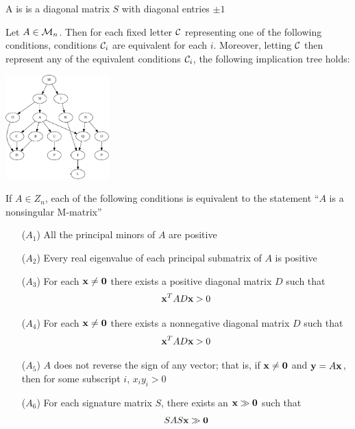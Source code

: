 \documentclass[aspectratio=169]{beamer}
\begin{document}
\begin{frame}
\begin{definition}
 A  is is a diagonal matrix $S$ with diagonal entries $\pm 1$
\end{definition}   
\end{frame}



\begin{frame}
\begin{theorem}
Let $A\in\mathcal{M}_n$. Then for each fixed letter $\mathcal{C}$ representing one of the following conditions, conditions $\mathcal{C}_i$ are equivalent for each $i$. Moreover, letting $\mathcal{C}$ then represent any of the equivalent conditions $\mathcal{C}_i$, the following implication tree holds:
\begin{center}
	\includegraphics[width=0.3\textwidth]{BermanPlemmons_fig}
\end{center}
If $A\in Z_n$, each of the following conditions is equivalent to the statement ``$A$ is a nonsingular M-matrix''
\end{theorem}
\end{frame}

\begin{frame}
\addtocounter{theorem}{-1}
\begin{theorem}[Continued]
\begin{enumerate}
\item[($A_1$)] All the principal minors of $A$ are positive
\item[($A_2$)] Every real eigenvalue of each principal submatrix of $A$ is positive
\item[($A_3$)] For each $\bx\neq\b0$ there exists a positive diagonal matrix $D$ such that
\[
\mathbf{x}^TAD\mathbf{x}>0
\]
\item[($A_4$)] For each $\bx\neq\b0$ there exists a nonnegative diagonal matrix $D$ such that
\[
\mathbf{x}^TAD\mathbf{x}>0
\]
\item[($A_5$)] $A$ does not reverse the sign of any vector; that is, if $\bx\neq\b0$ and $\mathbf{y}=A\mathbf{x}$, then for some subscript $i$, $x_iy_i>0$
\item[($A_6$)] For each signature matrix $S$, there exists an $\bx\gg\b0$ such that
\[
SAS\bx\gg\b0
\]
\end{enumerate}
\end{theorem}
\end{frame}
\end{document}
